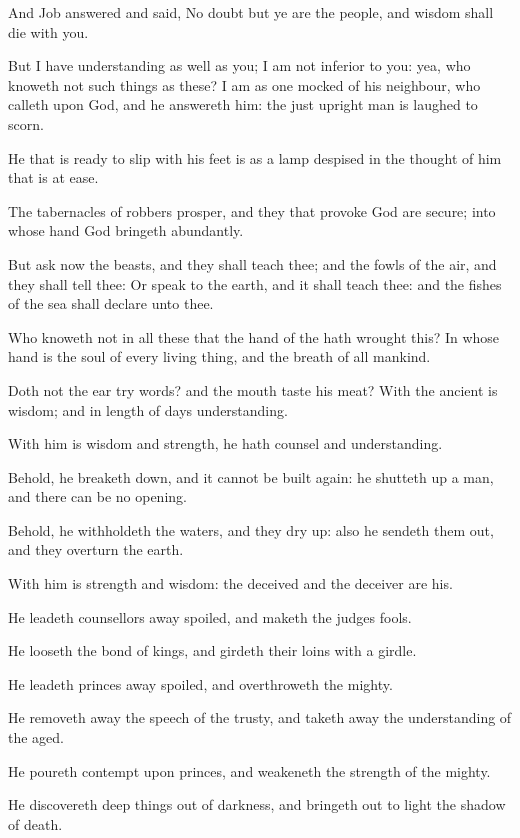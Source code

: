 \Chapter
\Verse And Job answered and said, \Verse No doubt but ye are the people, and wisdom shall die with you.

\Verse But I have understanding as well as you; I am not inferior to you: yea, who knoweth not such things as these?  \Verse I am as one mocked of his neighbour, who calleth upon God, and he answereth him: the just upright man is laughed to scorn.

\Verse He that is ready to slip with his feet is as a lamp despised in the thought of him that is at ease.

\Verse The tabernacles of robbers prosper, and they that provoke God are secure; into whose hand God bringeth abundantly.

\Verse But ask now the beasts, and they shall teach thee; and the fowls of the air, and they shall tell thee: \Verse Or speak to the earth, and it shall teach thee: and the fishes of the sea shall declare unto thee.

\Verse Who knoweth not in all these that the hand of the \LORD hath wrought this?  \Verse In whose hand is the soul of every living thing, and the breath of all mankind.

\Verse Doth not the ear try words? and the mouth taste his meat?  \Verse With the ancient is wisdom; and in length of days understanding.

\Verse With him is wisdom and strength, he hath counsel and understanding.

\Verse Behold, he breaketh down, and it cannot be built again: he shutteth up a man, and there can be no opening.

\Verse Behold, he withholdeth the waters, and they dry up: also he sendeth them out, and they overturn the earth.

\Verse With him is strength and wisdom: the deceived and the deceiver are his.

\Verse He leadeth counsellors away spoiled, and maketh the judges fools.

\Verse He looseth the bond of kings, and girdeth their loins with a girdle.

\Verse He leadeth princes away spoiled, and overthroweth the mighty.

\Verse He removeth away the speech of the trusty, and taketh away the understanding of the aged.

\Verse He poureth contempt upon princes, and weakeneth the strength of the mighty.

\Verse He discovereth deep things out of darkness, and bringeth out to light the shadow of death.

